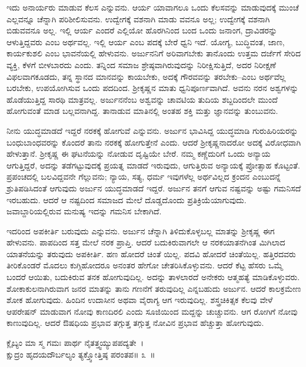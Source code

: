 ಇದು ಅನಾರ್ಯರು ಮಾಡುವ ಕೆಲಸ ಎನ್ನುವನು. ಆರ್ಯ ಯಾವಾಗಲೂ ಒಂದು ಕೆಲಸವನ್ನು ಮಾಡುವುದಕ್ಕೆ ಮುಂಚೆ ಎಲ್ಲವನ್ನೂ ಚೆನ್ನಾಗಿ ಪರಿಶೀಲಿಸುವನು. ಉದ್ವೇಗಕ್ಕೆ ವಶನಾಗಿ ಮಾಡು ವವನೂ ಅಲ್ಲ; ಉದ್ವೇಗಕ್ಕೆ ವಶನಾಗಿ ಬಿಡುವವನೂ ಅಲ್ಲ. ಇಲ್ಲಿ ಆರ್ಯ ಎಂದರೆ ಎಲ್ಲಿಯೋ ಹೊರಗಿನಿಂದ ಬಂದ ಒಂದು ಜನಾಂಗ, ದ್ರಾವಿಡರನ್ನು ಆಳುತ್ತಿದ್ದವರು ಎಂಬ ಅರ್ಥವಲ್ಲ. ಇಲ್ಲಿ ಆರ್ಯ ಎಂಬ ಪದಕ್ಕೆ ಬೇರೆ ಧ್ವನಿ ಇದೆ. ಯೋಗ್ಯ, ಬುದ್ಧಿವಂತ, ಜಾಣ, ಕಾರ್ಯಕುಶಲಿ ಎಂಬ ಭಾವನೆಯಲ್ಲಿ ಹೇಳುವನು. ಅರ್ಜುನನಿಗೆ ಅರಿವಾಗಬೇಕು ತಾನೊಂದು ಉತ್ತಮ ದರ್ಜೆಗೆ ಸೇರಿದ ವ್ಯಕ್ತಿ, ಕೆಳಗೆ ಬೀಳಬಾರದು ಎಂದು. ತನ್ನಿಂದ ಸಮಾಜ ಶ್ರೇಷ್ಠವಾಗಿರುವುದನ್ನು ನಿರೀಕ್ಷಿಸುತ್ತಿದೆ, ಅದರ ನಿರೀಕ್ಷಣೆ ವಿಫಲವಾಗಕೂಡದು, ತನ್ನ ಸ್ಥಾನದ ಮಾನವನ್ನು ಕಾಯಬೇಕು, ಅದಕ್ಕೆ ಗೌರವವನ್ನು ತರಬೇಕು–ಎಂಬ ಅರ್ಥವೆಲ್ಲ ಬರಬೇಕು, ಉಪಯೋಗಿಸುವ ಒಂದು ಪದದಿಂದ. ಶ‍್ರೀಕೃಷ್ಣನ ಮಾತು ಧ್ವನಿಪೂರ್ಣವಾಗಿದೆ. ಅವನು ನರನ ಅಶ್ವಗಳನ್ನು ಹೊಡೆಯುತ್ತಿದ್ದ ಸಾರಥಿ ಮಾತ್ರವಲ್ಲ. ಅರ್ಜುನನೆಂಬ ಅಶ್ವವನ್ನು ಚಾವಟಿಯ ತುದಿಯ ಶಬ್ದದಿಂದಲೇ ಮುಂದೆ ಹೋಗುವಂತೆ ಮಾಡ ಬಲ್ಲವನಾಗಿದ್ದ. ತಾನಾಡುವ ಮಾತಿನಲ್ಲಿ ಅಂತಹ ಶಕ್ತಿ ಮತ್ತು ಜ್ಞಾನವನ್ನು ತುಂಬುವನು.

ನೀನು ಯುದ್ಧಮಾಡದೆ ಇದ್ದರೆ ನರಕಕ್ಕೆ ಹೋಗುವೆ ಎನ್ನುವನು. ಅರ್ಜುನ ಭಾವಿಸಿದ್ದ ಯುದ್ಧಮಾಡಿ ಗುರುಹಿರಿಯರನ್ನು ಬಂಧುಬಾಂಧವರನ್ನು ಕೊಂದರೆ ತಾನು ನರಕಕ್ಕೆ ಹೋಗುತ್ತೇನೆ ಎಂದು. ಆದರೆ ಶ‍್ರೀಕೃಷ್ಣನಾದರೋ ಅದಕ್ಕೆ ವಿರೋಧವಾಗಿ ಹೇಳುತ್ತಾನೆ. ಶ‍್ರೀಕೃಷ್ಣ ಈ ಘಟನೆಯನ್ನು ನೋಡುವ ದೃಷ್ಟಿಯೇ ಬೇರೆ. ನಮ್ಮ ಕಣ್ಣೆದುರಿಗೆ ಒಂದು ಅನ್ಯಾಯ ಆಗುತ್ತಿದ್ದರೆ, ಅದನ್ನು ತಡೆಗಟ್ಟುವುದಕ್ಕೆ ಪ್ರಯತ್ನ ಮಾಡದೆ ಇರುವುದು, ಆಗುತ್ತಿರುವ ಅನ್ಯಾಯಕ್ಕೆ ಪ್ರೋತ್ಸಾಹ ಕೊಟ್ಟಂತೆ. ಪ್ರಪಂಚದಲ್ಲಿ ಬಲವಿದ್ದವನೇ ಗೆಲ್ಲುವನು; ನ್ಯಾಯ, ಸತ್ಯ, ಧರ್ಮ ಇವುಗಳೆಲ್ಲ ಅರ್ಥವಿಲ್ಲದ ಕ್ರಂದನ ಎಂಬುದನ್ನೆ ಶ್ರುತಿಪಡಿಸಿದಂತೆ ಆಗುವುದು ಅರ್ಜುನ ಯುದ್ಧಮಾಡದೆ ಇದ್ದರೆ. ಅರ್ಜುನ ತನಗೆ ಆಗುವ ನಷ್ಟವನ್ನು ಅಷ್ಟು ಗಮನಿಸದೆ ಇರಬಹುದು. ಆದರೆ ಆ ನಷ್ಟದಿಂದ ಸಮಾಜದ ಮೇಲೆ ದೊಡ್ಡದೊಂದು ಪ್ರತಿಕ್ರಿಯೆಯಾಗುವುದು. ಜವಾಬ್ದಾರಿಯಲ್ಲಿರುವ ಮನುಷ್ಯ ಇದನ್ನು ಗಮನಿಸ ಬೇಕಾಗಿದೆ.

ಇದರಿಂದ ಅಪಕೀರ್ತಿ ಬರುವುದು ಎನ್ನುವನು. ಅರ್ಜುನ ಚೆನ್ನಾಗಿ ತಿಳಿದುಕೊಳ್ಳಬಲ್ಲ ಮಾತನ್ನು ಶ‍್ರೀಕೃಷ್ಣ ಈಗ ಹೇಳುವನು. ಪಾಪದಿಂದ ಸತ್ತ ಮೇಲೆ ನರಕ ಪ್ರಾಪ್ತಿ. ಆದರೆ ಬದುಕಿರುವಾಗಲೇ ಆ ನರಕಯಾತನೆಗಿಂತ ಮಿಗಿಲಾದ ಯಾತನೆಯನ್ನು ತರುವುದು ಅಪಕೀರ್ತಿ. ಹಣ ಹೋದರೆ ಚಿಂತೆ ಯಿಲ್ಲ. ಪದವಿ ಹೋದರೆ ಚಿಂತೆಯಿಲ್ಲ. ಹತ್ತಿರದವರು ತೀರಿಕೊಂಡರೆ ಮೊದಲು ಕುಗ್ಗಿಹೋದರೂ ಅನಂತರ ಹೇಗೋ ಚೇತರಿಸಿಕೊಳ್ಳುವನು. ಆದರೆ ಕೆಟ್ಟ ಹೆಸರು ಒಮ್ಮೆ ಬಂದರೆ ಆಯಿತು, ಬದುಕಿರುವ ತನಕ ಹೋಗುವುದಿಲ್ಲ. ಅದನ್ನು ತಾಳಲಾರದೆ ಅನೇಕರು ಆತ್ಮಹತ್ಯೆ ಮಾಡಿಕೊಳ್ಳುವರು. ಶೋಕಾಕುಲನಾಗಿರುವಾಗ ಜನರ ಮಾತನ್ನು ತಾನು ಗಣನೆಗೆ ತರುವುದಿಲ್ಲ ಎನ್ನಬಹುದು ಅರ್ಜುನ. ಆದರೆ ಕಾಲಕ್ರಮೇಣ ಶೋಕ ಹೋಗುವುದು. ಹಿಂದಿನ ಉದಾಸೀನ ಅಥವಾ ವೈರಾಗ್ಯ ಆಗ ಇರುವುದಿಲ್ಲ. ಶಸ್ತ್ರಚಿಕಿತ್ಸಕ ಕೆಲವು ವೇಳೆ ಆಪರೇಷನ್ ಮಾಡುವಾಗ ನೋವು ಕಾಣದಿರಲಿ ಎಂದು ಸೂಜಿಯಿಂದ ಮದ್ದನ್ನು ಚುಚ್ಚುವನು. ಆಗ ರೋಗಿಗೆ ನೋವು ಕಾಣುವುದಿಲ್ಲ. ಆದರೆ ಔಷಧಿಯ ಪ್ರಭಾವ ತಗ್ಗುತ್ತ ತಗ್ಗುತ್ತ ನೋವಿನ ಪ್ರಭಾವ ಹೆಚ್ಚುತ್ತಾ ಹೋಗುವುದು.

\begin{shloka}
ಕ್ಲೈಬ್ಯಂ ಮಾ ಸ್ಮ ಗಮಃ ಪಾರ್ಥ ನೈತತ್ತ್ವಯ್ಯುಪಪದ್ಯತೇ~।\\ಕ್ಷುದ್ರಂ ಹೃದಯದೌರ್ಬಲ್ಯಂ ತ್ಯಕ್ತ್ವೋತ್ತಿಷ್ಠ ಪರಂತಪ\hfill॥ ೩~॥
\end{shloka}


